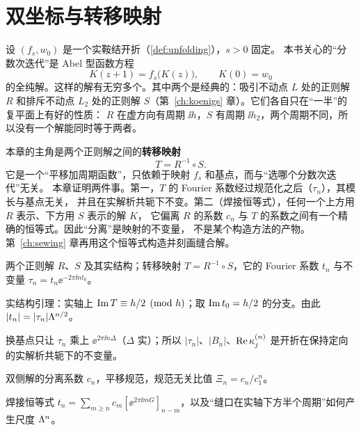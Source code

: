 
\chapter{双坐标与转移映射}\label{ch:transition}

设 $(f_s,w_0)$ 是一个实鞍结开折（\cref{def:unfolding}），$s>0$ 固定。
本书关心的``分数次迭代''是 Abel 型函数方程
\begin{equation}\label{ch5:eq:abel}
 K(z+1)=f_s\bigl(K(z)\bigr),\qquad K(0)=w_0
\end{equation}
的全纯解。这样的解有无穷多个。其中两个是经典的：吸引不动点 $L$ 处的正则解 $R$
和排斥不动点 $L_2$ 处的正则解 $S$（第~\ref{ch:koenigs} 章）。它们各自只在``一半''的复平面上有好的性质：
$R$ 在虚方向有周期 $\ii h$，$S$ 有周期 $\ii h_2$，两个周期不同，所以没有一个解能同时等于两者。

本章的主角是两个正则解之间的\textbf{转移映射}
\[
 T=R^{-1}\circ S .
\]
它是一个``平移加周期函数''，只依赖于映射 $f_s$ 和基点，而与``选哪个分数次迭代''无关。
本章证明两件事。第一，$T$ 的 Fourier 系数经过规范化之后（$\tau_n$），其模长与基点无关，
并且在实解析共轭下不变。第二（焊接恒等式），任何一个上方用 $R$ 表示、下方用 $S$ 表示的解 $K$，
它偏离 $R$ 的系数 $c_n$ 与 $T$ 的系数之间有一个精确的恒等式。因此``分离''是映射的不变量，
不是某个构造方法的产物。第~\ref{ch:sewing} 章再用这个恒等式构造并刻画缝合解。

\begin{goals}
\item 两个正则解 $R$、$S$ 及其实结构；转移映射 $T=R^{-1}\circ S$，它的 Fourier 系数 $t_n$ 与不变量 $\tau_n=t_n\ee^{-2\pi\ii nt_0}$。
\item 实结构引理：实轴上 $\operatorname{Im} T\equiv h/2\pmod h$；取 $\operatorname{Im} t_0=h/2$ 的分支。由此 $|t_n|=|\tau_n|\Lambda^{n/2}$。
\item 换基点只让 $\tau_n$ 乘上 $\ee^{2\pi\ii n\Delta}$（$\Delta$ 实）；所以 $|\tau_n|$、$|B_n|$、$\operatorname{Re}\kappa^{(n)}_j$ 是开折在保持定向的实解析共轭下的不变量。
\item 双侧解的分离系数 $c_n$，平移规范，规范无关比值 $\Xi_n=c_n/c_1^n$。
\item 焊接恒等式 $t_n=\sum_{m\ge n}c_m[\ee^{2\pi\ii mG}]_{n-m}$，以及``缝口在实轴下方半个周期''如何产生尺度 $\Lambda^n$。
\end{goals}

